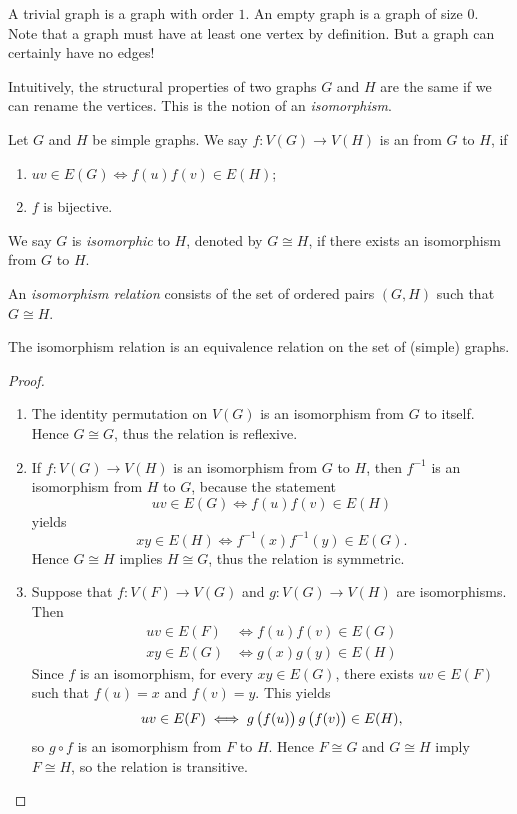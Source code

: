 \begin{remark}
A trivial graph is a graph with order $1$. An empty graph is a graph of size $0$. Note that a graph must have at least one vertex by definition. But a graph can certainly have no edges!
\end{remark}

Intuitively, the structural properties of two graphs $G$ and $H$ are the same if we can rename the vertices. This is the notion of an \emph{isomorphism}.

\begin{definition}[Isomorphism]
Let $G$ and $H$ be simple graphs. We say $f:V(G)\to V(H)$ is an  from $G$ to $H$, if
\begin{enumerate}[label=(\roman*)]
\item $uv\in E(G)\iff f(u)f(v)\in E(H)$;
\item $f$ is bijective.
\end{enumerate}
We say $G$ is \emph{isomorphic} to $H$, denoted by $G\cong H$, if there exists an isomorphism from $G$ to $H$.
\end{definition}

An \emph{isomorphism relation} consists of the set of ordered pairs $(G,H)$ such that $G\cong H$.

\begin{lemma}
The isomorphism relation is an equivalence relation on the set of (simple) graphs.
\end{lemma}

\begin{proof} \
\begin{enumerate}[label=(\roman*)]
\item The identity permutation on $V(G)$ is an isomorphism from $G$ to itself. Hence $G\cong  G$, thus the relation is reflexive.
\item If $f:V(G)\to V(H)$ is an isomorphism from $G$ to $H$, then $f^{-1}$ is an isomorphism from $H$ to $G$, because the statement
\[uv\in E(G)\iff f(u)f(v)\in E(H)\]
yields
\[xy\in E(H)\iff f^{-1}(x)f^{-1}(y)\in E(G).\]
Hence $G\cong H$ implies $H\cong G$, thus the relation is symmetric.
\item Suppose that $f:V(F)\to V(G)$ and $g:V(G)\to V(H)$ are isomorphisms. Then
\begin{align*}
uv\in E(F)&\iff f(u)f(v)\in E(G)\\
xy\in E(G)&\iff g(x)g(y)\in E(H)
\end{align*}
Since $f$ is an isomorphism, for every $xy\in E(G)$, there exists $uv\in E(F)$ such that $f(u)=x$ and $f(v)=y$. This yields
\[uv\in E(F)\iff g\left(f(u)\right)g\left(f(v)\right)\in E(H),\]
so $g\circ f$ is an isomorphism from $F$ to $H$. Hence $F\cong G$ and $G\cong H$ imply $F\cong H$, so the relation is transitive.
\end{enumerate}
\end{proof}

